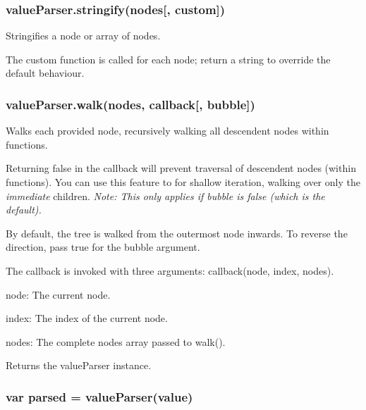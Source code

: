 {\ttfamily \subsubsection*{value\+Parser.\+stringify(nodes\mbox{[}, custom\mbox{]})}}

{\ttfamily }

{\ttfamily Stringifies a node or array of nodes.}

{\ttfamily The {\ttfamily custom} function is called for each {\ttfamily node}; return a string to override the default behaviour.}

{\ttfamily \subsubsection*{value\+Parser.\+walk(nodes, callback\mbox{[}, bubble\mbox{]})}}

{\ttfamily }

{\ttfamily Walks each provided node, recursively walking all descendent nodes within functions.}

{\ttfamily Returning {\ttfamily false} in the {\ttfamily callback} will prevent traversal of descendent nodes (within functions). You can use this feature to for shallow iteration, walking over only the {\itshape immediate} children. {\itshape Note\+: This only applies if {\ttfamily bubble} is {\ttfamily false} (which is the default).}}

{\ttfamily By default, the tree is walked from the outermost node inwards. To reverse the direction, pass {\ttfamily true} for the {\ttfamily bubble} argument.}

{\ttfamily The {\ttfamily callback} is invoked with three arguments\+: {\ttfamily callback(node, index, nodes)}.}

{\ttfamily 
\begin{DoxyItemize}
\item {\ttfamily node}\+: The current node.
\item {\ttfamily index}\+: The index of the current node.
\item {\ttfamily nodes}\+: The complete nodes array passed to {\ttfamily walk()}.
\end{DoxyItemize}}

{\ttfamily Returns the {\ttfamily value\+Parser} instance.}

{\ttfamily \subsubsection*{var parsed = value\+Parser(value)}}

